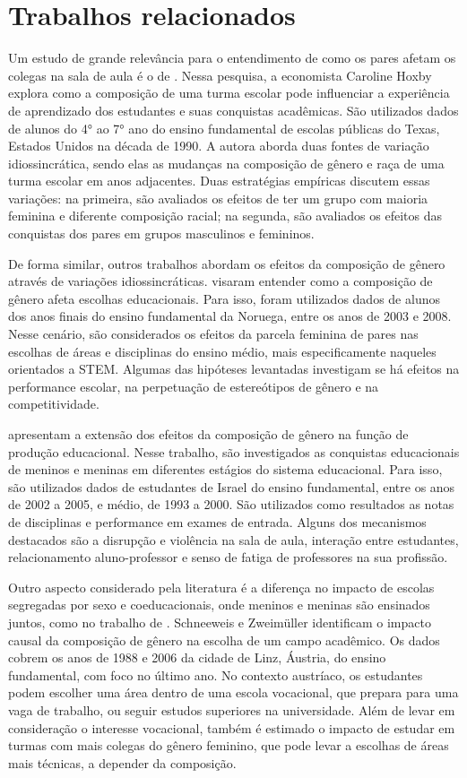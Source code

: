 \chapter{Trabalhos relacionados}

Um estudo de grande relevância para o entendimento de como os pares afetam os colegas na sala de aula é o de \citet{Hoxby-2000}. Nessa pesquisa, a economista Caroline Hoxby explora como a composição de uma turma escolar pode influenciar a experiência de aprendizado dos estudantes e suas conquistas acadêmicas. São utilizados dados de alunos do 4° ao 7° ano do ensino fundamental de escolas públicas do Texas, Estados Unidos na década de 1990. A autora aborda duas fontes de variação idiossincrática, sendo elas as mudanças na composição de gênero e raça de uma turma escolar em anos adjacentes. Duas estratégias empíricas discutem essas variações: na primeira, são avaliados os efeitos de ter um grupo com maioria feminina e diferente composição racial; na segunda, são avaliados os efeitos das conquistas dos pares em grupos masculinos e femininos.

De forma similar, outros trabalhos abordam os efeitos da composição de gênero através de variações idiossincráticas. \citet{Schne2019} visaram entender como a composição de gênero afeta escolhas educacionais. Para isso, foram utilizados dados de alunos dos anos finais do ensino fundamental da Noruega, entre os anos de 2003 e 2008. Nesse cenário, são considerados os efeitos da parcela feminina de pares nas escolhas de áreas e disciplinas do ensino médio, mais especificamente naqueles orientados a STEM. Algumas das hipóteses levantadas investigam se há efeitos na performance escolar, na perpetuação de estereótipos de gênero e na competitividade.

\citet{Lavy2011} apresentam a extensão dos efeitos da composição de gênero na função de produção educacional. Nesse trabalho, são investigados as conquistas educacionais de meninos e meninas em diferentes estágios do sistema educacional. Para isso, são utilizados dados de estudantes de Israel do ensino fundamental, entre os anos de 2002 a 2005, e médio, de 1993 a 2000. São utilizados como resultados as notas de disciplinas e performance em exames de entrada. Alguns dos mecanismos destacados são a disrupção e violência na sala de aula, interação entre estudantes, relacionamento aluno-professor e senso de fatiga de professores na sua profissão.

Outro aspecto considerado pela literatura é a diferença no impacto de escolas segregadas por sexo e coeducacionais, onde meninos e meninas são ensinados juntos, como no  trabalho de \citet{Schneeweis2012}. Schneeweis e Zweimüller identificam o impacto causal da composição de gênero na escolha de um campo acadêmico. Os dados cobrem os anos de 1988 e 2006 da cidade de Linz, Áustria, do ensino fundamental, com foco no último ano. No contexto austríaco, os estudantes podem escolher uma área dentro de uma escola vocacional, que prepara para uma vaga de trabalho, ou seguir estudos superiores na universidade. Além de levar em consideração o interesse vocacional, também é estimado o impacto de estudar em turmas com mais colegas do gênero feminino, que pode levar a escolhas de áreas mais técnicas, a depender da composição.

